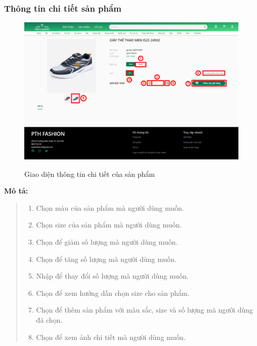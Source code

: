 \subsubsection{Thông tin chi tiết sản phẩm}
\begin{figure}[!htp]
    \centering
    \includegraphics[width=5in]{img/UI/new_customer/product_detail.png}
    \label{9}
    \newline
    \caption{Giao diện thông tin chi tiết của sản phẩm}
\end{figure}
\textbf{Mô tả:}
\begin{quote}
    \begin{enumerate}
        \item Chọn màu của sản phẩm mà người dùng muốn.
        \item Chọn size của sản phẩm mà người dùng muốn.
        \item Chọn để giảm số lượng mà người dùng muốn.
        \item Chọn để tăng số lượng mà người dùng muốn.
        \item Nhập để thay đổi số lượng mà người dùng muốn.
        \item Chọn để xem hướng dẫn chọn size cho sản phẩm.
        \item Chọn để thêm sản phẩm với màu sắc, size và số lượng mà người dùng đã chọn.
        \item Chọn để xem ảnh chi tiết mà người dùng muốn.
    \end{enumerate}
\end{quote}


